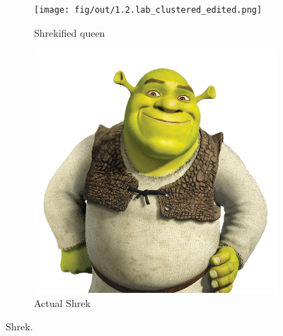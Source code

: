 \documentclass[tikz,14pt,fleqn]{article}
\begin{document}
\begin{figure}[H]
    \centering
    \begin{subfigure}[]{0.3\linewidth}
        \texttt{[image: fig/out/1.2.lab\_clustered\_edited.png]}
        \caption{Shrekified queen}
        \label{fig:1.2.lab_edited}
    \end{subfigure}
    \begin{subfigure}[]{0.3\linewidth}
        \includegraphics[width=\linewidth]{fig/1.2.shrek.jpg}
        \caption{Actual Shrek}
        \label{fig:1.2.shrek}
    \end{subfigure}
    \caption{Shrek.}
    \label{fig:1.2.edited}
\end{figure}
\end{document}
